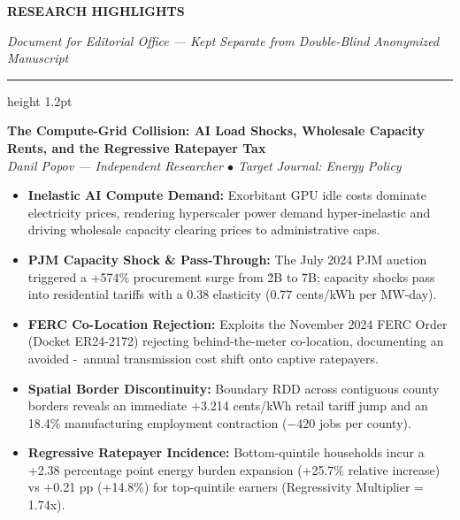 \documentclass[11pt]{article}
\begin{document}
\begin{center}
    {\large \textbf{RESEARCH HIGHLIGHTS}}\par
    {\footnotesize \textit{Document for Editorial Office --- Kept Separate from Double-Blind Anonymized Manuscript}}\par
    \vspace{0.4cm}
    \hrule height 1.2pt
\end{center}
\vspace{0.3cm}

\noindent \textbf{The Compute-Grid Collision: AI Load Shocks, Wholesale Capacity Rents, and the Regressive Ratepayer Tax} \\
\textit{Danil Popov --- Independent Researcher $\bullet$ Target Journal: Energy Policy} \\
\vspace{0.4cm}

\begin{itemize}
    \item \textbf{Inelastic AI Compute Demand:} Exorbitant GPU idle costs dominate electricity prices, rendering hyperscaler power demand hyper-inelastic and driving wholesale capacity clearing prices to administrative caps.
    \item \textbf{PJM Capacity Shock \& Pass-Through:} The July 2024 PJM auction triggered a +574\% procurement surge from \.2B to \.7B; capacity shocks pass into residential tariffs with a 0.38 elasticity (0.77 cents/kWh per \/MW-day).
    \item \textbf{FERC Co-Location Rejection:} Exploits the November 2024 FERC Order (Docket ER24-2172) rejecting behind-the-meter co-location, documenting an avoided \--\ annual transmission cost shift onto captive ratepayers.
    \item \textbf{Spatial Border Discontinuity:} Boundary RDD across contiguous county borders reveals an immediate +3.214 cents/kWh retail tariff jump and an 18.4\% manufacturing employment contraction ($-420$ jobs per county).
    \item \textbf{Regressive Ratepayer Incidence:} Bottom-quintile households incur a +2.38 percentage point energy burden expansion (+25.7\% relative increase) vs +0.21 pp (+14.8\%) for top-quintile earners (Regressivity Multiplier = 1.74x).
\end{itemize}
\end{document}
